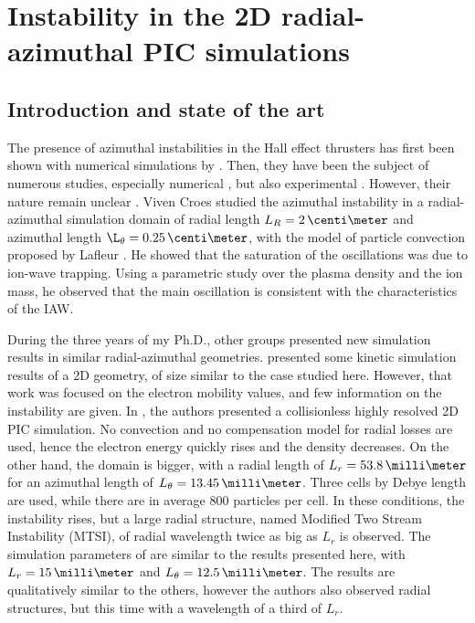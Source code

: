 
\section{Instability in the \acs{2D} radial-azimuthal \acs{PIC} simulations}
  \label{sec-PIC-ECDI}
  
  \subsection{Introduction and state of the art} \label{subsec-indroECDI}
        
    The presence of azimuthal instabilities in the Hall effect thrusters has first been shown with numerical simulations by \citet{adam2004}.
    Then, they have been the subject of numerous studies, especially numerical \citep{ducrocq2006,lafleur2016,lafleur2016a,croes2017,croes2018,janhunen2018,taccogna2019}, but also experimental \citep{honore2011,cavalier2013,cavalier2013a}.
    However, their nature remain unclear \citep{boeuf2018}.
    Viven Croes studied the azimuthal instability in a radial-azimuthal simulation domain of radial length $L_R=2\,\centi\meter$ and azimuthal length $\L_{\theta}=0.25\,\centi\meter$, with the model of particle convection proposed by Lafleur \citep{croes2017,croes2018}.
    He showed that the saturation of the oscillations was due to ion-wave trapping.
    Using a parametric study over the plasma density and the ion mass, he observed that the main oscillation is consistent with the characteristics of the \ac{IAW}.
    
    During the three years of my Ph.D., other groups presented new simulation results in similar radial-azimuthal geometries.
    \citet{hara2019a} presented some kinetic simulation results of a \ac{2D} geometry, of size similar to the case studied here.
    However, that work was focused on the electron mobility values, and few information on the instability are given.
    In \citet{janhunen2018}, the authors presented a collisionless highly resolved \ac{2D} \ac{PIC} simulation.
    No convection and no compensation model for radial losses are used, hence the electron energy quickly rises and the density decreases.
    On the other hand, the domain is bigger, with a radial length of $L_r = 53.8\,\milli\meter$ for an azimuthal length of $L_{\theta} = 13.45 \,\milli\meter$.
    Three cells by Debye length are used, while there are in average 800 particles per cell.
    In these conditions, the instability rises, but a large radial structure, named Modified Two Stream Instability (MTSI), of radial wavelength twice as big as $L_r$  is observed.
    The simulation parameters of \citet{taccogna2019} are similar to the results presented here, with  $L_r = 15\,\milli\meter$ and $L_{\theta} = 12.5 \,\milli\meter$.
    The results are qualitatively similar to the others, however the authors also observed radial structures, but this time with a wavelength of a third of $L_r$.
        
